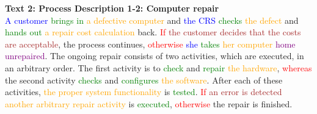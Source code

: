 \textbf{Text 2: Process Description 1-2: Computer repair}\\
\textcolor{blue}{A} \textcolor{blue}{customer} \textcolor{green}{brings} \textcolor{green}{in} \textcolor{orange}{a} \textcolor{orange}{defective} \textcolor{orange}{computer} and \textcolor{blue}{the} \textcolor{blue}{CRS} \textcolor{green}{checks} \textcolor{orange}{the} \textcolor{orange}{defect} and \textcolor{green}{hands} \textcolor{green}{out} \textcolor{orange}{a} \textcolor{orange}{repair} \textcolor{orange}{cost} \textcolor{orange}{calculation} back. \textcolor{red}{If} \textcolor{brown}{the} \textcolor{brown}{customer} \textcolor{brown}{decides} \textcolor{brown}{that} \textcolor{brown}{the} \textcolor{brown}{costs} \textcolor{brown}{are} \textcolor{brown}{acceptable}, the process continues, \textcolor{red}{otherwise} \textcolor{blue}{she} \textcolor{green}{takes} \textcolor{orange}{her} \textcolor{orange}{computer} \textcolor{purple}{home} \textcolor{purple}{unrepaired}. The ongoing repair consists of two activities, which are executed, in an arbitrary order. The first activity is to \textcolor{green}{check} and \textcolor{green}{repair} \textcolor{orange}{the} \textcolor{orange}{hardware}, \textcolor{red}{whereas} the second activity \textcolor{green}{checks} and \textcolor{green}{configures} \textcolor{orange}{the} \textcolor{orange}{software}. After each of these activities, \textcolor{orange}{the} \textcolor{orange}{proper} \textcolor{orange}{system} \textcolor{orange}{functionality} is \textcolor{green}{tested}. \textcolor{red}{If} \textcolor{brown}{an} \textcolor{brown}{error} \textcolor{brown}{is} \textcolor{brown}{detected} \textcolor{orange}{another} \textcolor{orange}{arbitrary} \textcolor{orange}{repair} \textcolor{orange}{activity} is \textcolor{green}{executed}, \textcolor{red}{otherwise} the repair is finished.

